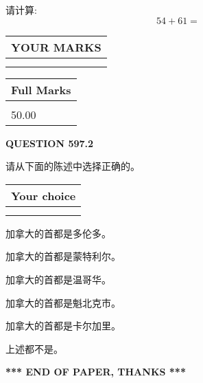 \documentclass{ctexart}
\begin{document}
  
 
请计算:
\begin{equation}
54 +  %
61 = \nonumber
\end{equation}
 

 

 
  
\vspace{0.2in}
  
\noindent\begin{tabular}{|l|}
\hline
 YOUR MARKS  \\
\hline
 \\ 
 \\ 
\hline
\end{tabular}
\hspace{0.05in} \begin{tabular}{|l|}
\hline
 Full Marks  \\
\hline
 \\ 
50.00 \\
\hline
\end{tabular}
{\textbf{\Large{QUESTION
597.2 
}}}
  
  
请从下面的陈述中选择正确的。
  
  
\noindent\hspace{3.0in} \begin{tabular}{|l|}
\hline
Your choice \\
\hline
 \\ 
 \\ 
\hline
\end{tabular}
  
  
 
 
加拿大的首都是多伦多。
 
 
加拿大的首都是蒙特利尔。
 
 
加拿大的首都是温哥华。
 
 
加拿大的首都是魁北克市。
 
 
加拿大的首都是卡尔加里。
 
 
 上述都不是。
 
 
   
   
 \vspace{0.2in}
 
   
   
   
   
\vspace{1.0in} 
{\textbf{\large{ *** END OF PAPER, THANKS *** }}} 
   
\end{document}
